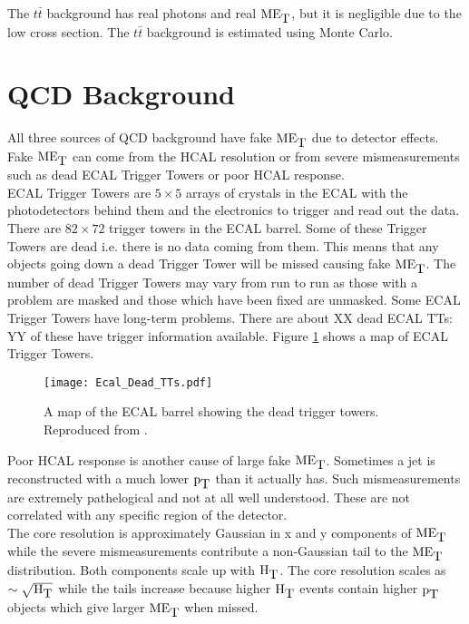 The $t\bar{t}$ background has real photons and real $\mbox{ME}_{\mbox{T}}$, but it is negligible 
due to the low cross section. The $t\bar{t}$ background is estimated using Monte
Carlo.
 
\section{QCD Background}
\label{sec:QCD_Background}

All three sources of QCD background have fake $\mbox{ME}_{\mbox{T}}$ due to detector effects.
Fake $\mbox{ME}_{\mbox{T}}$ can come from the HCAL resolution or from severe mismeasurements
such as dead ECAL Trigger Towers or poor HCAL response. \\

ECAL Trigger Towers are $5\times5$ arrays of crystals in the ECAL with the
photodetectors behind them and the electronics to trigger and read out the data. 
There are $82\times72$ trigger towers in the ECAL barrel. Some of these Trigger
Towers are dead i.e. there is no data coming from them. This means that any
objects going down a dead Trigger Tower will be missed causing fake $\mbox{ME}_{\mbox{T}}$. The 
number of dead Trigger Towers may vary from run to run as those with a problem 
are masked and those which have been fixed are unmasked. Some ECAL Trigger 
Towers have long-term problems. There are about XX dead ECAL TTs: YY of these 
have trigger information available. Figure \ref{fig:Dead_ECAL_TTs} shows a map 
of ECAL Trigger Towers. \\

\begin{figure}
\begin{center}
\texttt{[image: Ecal\_Dead\_TTs.pdf]}
\end{center}
\caption{A map of the ECAL barrel showing the dead trigger towers. Reproduced
from \cite{spikes}.}
\label{fig:Dead_ECAL_TTs}
\end{figure}

Poor HCAL response is another cause of large fake $\mbox{ME}_{\mbox{T}}$. Sometimes a jet is
reconstructed with a much lower $\mbox{p}_{\mbox{T}}$ than it actually has. Such mismeasurements
are extremely pathelogical and not at all well understood. These are not
correlated with any specific region of the detector. \\

The core resolution is approximately Gaussian in x and y components of $\mbox{ME}_{\mbox{T}}$ 
while the severe mismeasurements contribute a non-Gaussian tail to the $\mbox{ME}_{\mbox{T}}$ 
distribution. Both components scale up with $\mbox{H}_{\mbox{T}}$. The core resolution scales as
$\sim\sqrt{\mbox{H}_{\mbox{T}}}$ while the tails increase because higher $\mbox{H}_{\mbox{T}}$ events contain 
higher $\mbox{p}_{\mbox{T}}$ objects which give larger $\mbox{ME}_{\mbox{T}}$ when missed. \\

